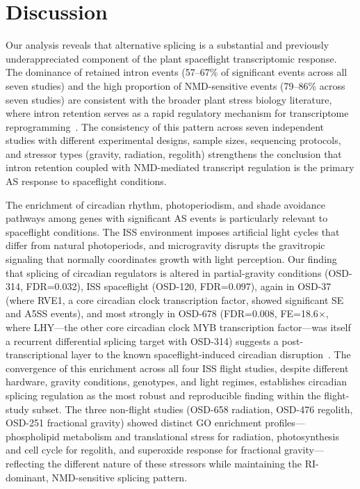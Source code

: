 \documentclass[12pt,a4paper]{article}
\begin{document}
\section{Discussion}

Our analysis reveals that alternative splicing is a substantial and previously underappreciated component of the plant spaceflight transcriptomic response. The dominance of retained intron events (57--67\% of significant events across all seven studies) and the high proportion of NMD-sensitive events (79--86\% across seven studies) are consistent with the broader plant stress biology literature, where intron retention serves as a rapid regulatory mechanism for transcriptome reprogramming~\cite{kalyna2012, drechsel2016}. The consistency of this pattern across seven independent studies with different experimental designs, sample sizes, sequencing protocols, and stressor types (gravity, radiation, regolith) strengthens the conclusion that intron retention coupled with NMD-mediated transcript regulation is the primary AS response to spaceflight conditions.

The enrichment of circadian rhythm, photoperiodism, and shade avoidance pathways among genes with significant AS events is particularly relevant to spaceflight conditions. The ISS environment imposes artificial light cycles that differ from natural photoperiods, and microgravity disrupts the gravitropic signaling that normally coordinates growth with light perception. Our finding that splicing of circadian regulators is altered in partial-gravity conditions (OSD-314, FDR=0.032), ISS spaceflight (OSD-120, FDR=0.097), again in OSD-37 (where RVE1, a core circadian clock transcription factor, showed significant SE and A5SS events), and most strongly in OSD-678 (FDR=0.008, FE=18.6$\times$, where LHY---the other core circadian clock MYB transcription factor---was itself a recurrent differential splicing target with OSD-314) suggests a post-transcriptional layer to the known spaceflight-induced circadian disruption~\cite{solheim2021}. The convergence of this enrichment across all four ISS flight studies, despite different hardware, gravity conditions, genotypes, and light regimes, establishes circadian splicing regulation as the most robust and reproducible finding within the flight-study subset. The three non-flight studies (OSD-658 radiation, OSD-476 regolith, OSD-251 fractional gravity) showed distinct GO enrichment profiles---phospholipid metabolism and translational stress for radiation, photosynthesis and cell cycle for regolith, and superoxide response for fractional gravity---reflecting the different nature of these stressors while maintaining the RI-dominant, NMD-sensitive splicing pattern.
\end{document}
